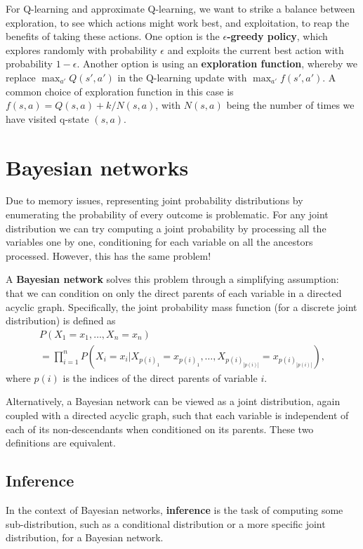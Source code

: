 \documentclass[12pt]{article}
\begin{document}
For Q-learning and approximate Q-learning, we want to strike a balance between exploration, to see which actions might work best, and exploitation, to reap the benefits of taking these actions. One option is the \textbf{$\epsilon$-greedy policy}, which explores randomly with probability $\epsilon$ and exploits the current best action with probability $1 - \epsilon$. Another option is using an \textbf{exploration function}, whereby we replace $\max_{a'} Q(s', a')$ in the Q-learning update with $\max_{a'} f(s', a')$. A common choice of exploration function in this case is $f(s, a) = Q(s, a) + k/N(s, a)$, with $N(s, a)$ being the number of times we have visited q-state $(s, a)$.

\section{Bayesian networks}

Due to memory issues, representing joint probability distributions by enumerating the probability of every outcome is problematic. For any joint distribution we can try computing a joint probability by processing all the variables one by one, conditioning for each variable on all the ancestors processed. However, this has the same problem!

A \textbf{Bayesian network} solves this problem through a simplifying assumption: that we can condition on only the direct parents of each variable in a directed acyclic graph. Specifically, the joint probability mass function (for a discrete joint distribution) is defined as
\begin{multline*}
P(X_1 = x_1, \ldots, X_n = x_n) \\
= \prod_{i = 1}^n P(X_i = x_i | X_{p(i)_1} = x_{p(i)_1}, \ldots, X_{p(i)_{|p(i)|}} = x_{p(i)_{|p(i)|}}),
\end{multline*}
where $p(i)$ is the indices of the direct parents of variable $i$.

Alternatively, a Bayesian network can be viewed as a joint distribution, again coupled with a directed acyclic graph, such that each variable is independent of each of its non-descendants when conditioned on its parents. These two definitions are equivalent.

\subsection{Inference}

In the context of Bayesian networks, \textbf{inference} is the task of computing some sub-distribution, such as a conditional distribution or a more specific joint distribution, for a Bayesian network.
\end{document}
